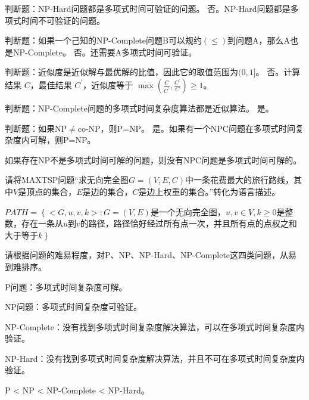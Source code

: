 \begin{problem}
	判断题：NP-Hard问题都是多项式时间可验证的问题。
	\solution 否。NP-Hard问题都是多项式时间不可验证的问题。
\end{problem}

\begin{problem}
	判断题：如果一个己知的NP-Complete问题B可以规约$(\le)$到问题A，那么A也是NP-Complete。
	\solution 否。还需要A多项式时间可验证。
\end{problem}

\begin{problem}
	判断题：近似度是近似解与最优解的比值，因此它的取值范围为$(0,1]$。
	\solution 否。计算结果 $C$，最佳结果 $C^\prime$，近似度等于 $\max(\frac{C}{C^\prime}, \frac{C^\prime}{C}) \ge 1$。
\end{problem}

\begin{problem}
	判断题：NP-Complete问题的多项式时间复杂度算法都是近似算法。
	\solution 是。
\end{problem}

\begin{problem}
	判断题：如果NP$\neq$co-NP，则P=NP。
	\solution 是。如果有一个NPC问题在多项式时间复杂度内可解，则P=NP。

	如果存在NP不是多项式时间可解的问题，则没有NPC问题是多项式时间可解的。
\end{problem}

\begin{problem}
	请将MAXTSP问题“求无向完全图$G=(V,E,C)$中一条花费最大的旅行路线，其中$V$是顶点的集合，$E$是边的集合，$C$是边上权重的集合。”转化为语言描述。
\end{problem}
\begin{solution}
	$PATH=\left\{<G,u,v,k>:G=(V,E)\right.$是一个无向完全图，$u,v\in V,k\ge 0$是整数，存在一条从$u$到$v$的路径，路径恰好经过所有点一次，并且所有点的点权之和大于等于$k\left.\right\}$
\end{solution}

\begin{problem}
	请根据问题的难易程度，对P、NP、NP-Hard、NP-Complete这四类问题，从易到难排序。
\end{problem}
\begin{solution}
	P问题：多项式时间复杂度可解。

	NP问题：多项式时间复杂度可验证。

	NP-Complete：没有找到多项式时间复杂度解决算法，可以在多项式时间复杂度内验证。
	
	NP-Hard：没有找到多项式时间复杂度解决算法，并且不可在多项式时间复杂度内验证。

	P < NP < NP-Complete < NP-Hard。
\end{solution}



